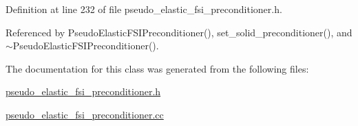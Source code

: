 Definition at line 232 of file pseudo\+\_\+elastic\+\_\+fsi\+\_\+preconditioner.\+h.



Referenced by Pseudo\+Elastic\+F\+S\+I\+Preconditioner(), set\+\_\+solid\+\_\+preconditioner(), and $\sim$\+Pseudo\+Elastic\+F\+S\+I\+Preconditioner().



The documentation for this class was generated from the following files\+:\begin{DoxyCompactItemize}
\item 
\hyperlink{pseudo__elastic__fsi__preconditioner_8h}{pseudo\+\_\+elastic\+\_\+fsi\+\_\+preconditioner.\+h}\item 
\hyperlink{pseudo__elastic__fsi__preconditioner_8cc}{pseudo\+\_\+elastic\+\_\+fsi\+\_\+preconditioner.\+cc}\end{DoxyCompactItemize}
